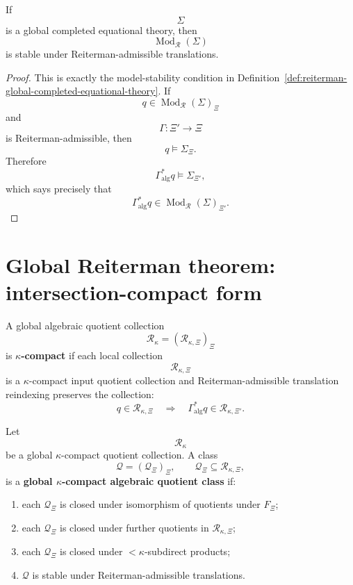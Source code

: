 \begin{proposition}
\label{prop:reiterman-global-models-translation-stable}
If
\[
\Sigma
\]
is a global completed equational theory, then
\[
\operatorname{Mod}_{\mathcal R}(\Sigma)
\]
is stable under Reiterman-admissible translations.
\end{proposition}

\begin{proof}
This is exactly the model-stability condition in
Definition~\ref{def:reiterman-global-completed-equational-theory}. If
\[
q\in\operatorname{Mod}_{\mathcal R}(\Sigma)_\Xi
\]
and
\[
\Gamma:\Xi'\to\Xi
\]
is Reiterman-admissible, then
\[
q\models\Sigma_\Xi.
\]
Therefore
\[
\Gamma_{\mathrm{alg}}^\ast q
\models
\Sigma_{\Xi'},
\]
which says precisely that
\[
\Gamma_{\mathrm{alg}}^\ast q
\in
\operatorname{Mod}_{\mathcal R}(\Sigma)_{\Xi'}.
\]
\end{proof}

\section{Global Reiterman theorem: intersection-compact form}
\label{sec:reiterman-global-intersection-compact}

\begin{definition}
\label{def:reiterman-global-kappa-compact-quotient-collection}
A global algebraic quotient collection
\[
\mathcal R_\kappa=(\mathcal R_{\kappa,\Xi})_\Xi
\]
is \textbf{\(\kappa\)-compact} if each local collection
\[
\mathcal R_{\kappa,\Xi}
\]
is a \(\kappa\)-compact input quotient collection and Reiterman-admissible
translation reindexing preserves the collection:
\[
q\in\mathcal R_{\kappa,\Xi}
\quad\Longrightarrow\quad
\Gamma_{\mathrm{alg}}^\ast q\in\mathcal R_{\kappa,\Xi'}.
\]
\end{definition}

\begin{definition}
\label{def:reiterman-global-kappa-compact-algebraic-class}
Let
\[
\mathcal R_\kappa
\]
be a global \(\kappa\)-compact quotient collection. A class
\[
\mathcal Q=(\mathcal Q_\Xi)_\Xi,
\qquad
\mathcal Q_\Xi\subseteq\mathcal R_{\kappa,\Xi},
\]
is a \textbf{global \(\kappa\)-compact algebraic quotient class} if:
\begin{enumerate}
\item each \(\mathcal Q_\Xi\) is closed under isomorphism of quotients under
\(F_\Xi\);
\item each \(\mathcal Q_\Xi\) is closed under further quotients in
\(\mathcal R_{\kappa,\Xi}\);
\item each \(\mathcal Q_\Xi\) is closed under \(<\kappa\)-subdirect products;
\item \(\mathcal Q\) is stable under Reiterman-admissible translations.
\end{enumerate}
\end{definition}

